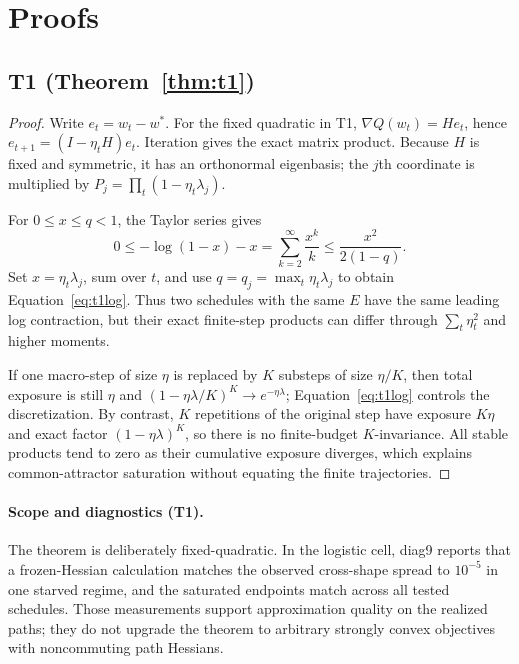 \documentclass{article}
\newcommand{\Expo}{E}         %
\begin{document}
\section{Proofs}
\label{app:proofs}
\subsection{T1 (Theorem~\ref{thm:t1})}
\begin{proof}[Proof]
Write $e_t=w_t-w^*$. For the fixed quadratic in T1,
$\nabla Q(w_t)=He_t$, hence $e_{t+1}=(I-\eta_tH)e_t$. Iteration gives the exact matrix product.
Because $H$ is fixed and symmetric, it has an orthonormal eigenbasis; the $j$th coordinate is
multiplied by $P_j=\prod_t(1-\eta_t\lambda_j)$.

For $0\leq x\leq q<1$, the Taylor series gives
\begin{equation}
0\leq-\log(1-x)-x=\sum_{k=2}^{\infty}\frac{x^k}{k}
\leq\frac{x^2}{2(1-q)}.
\end{equation}
Set $x=\eta_t\lambda_j$, sum over $t$, and use
$q=q_j=\max_t\eta_t\lambda_j$ to obtain Equation~\ref{eq:t1log}. Thus two schedules with the
same $\Expo$ have the same leading log contraction, but their exact finite-step products can
differ through $\sum_t\eta_t^2$ and higher moments.

If one macro-step of size $\eta$ is replaced by $K$ substeps of size $\eta/K$, then total
exposure is still $\eta$ and
$(1-\eta\lambda/K)^K\to e^{-\eta\lambda}$; Equation~\ref{eq:t1log} controls the discretization.
By contrast, $K$ repetitions of the original step have exposure $K\eta$ and exact factor
$(1-\eta\lambda)^K$, so there is no finite-budget $K$-invariance. All stable products tend to
zero as their cumulative exposure diverges, which explains common-attractor saturation without
equating the finite trajectories.
\end{proof}

\paragraph{Scope and diagnostics (T1).} The theorem is deliberately fixed-quadratic. In the
logistic cell, diag9 reports that a frozen-Hessian calculation matches the observed cross-shape
spread to $10^{-5}$ in one starved regime, and the saturated endpoints match across all tested
schedules. Those measurements support approximation quality on the realized paths; they do not
upgrade the theorem to arbitrary strongly convex objectives with noncommuting path Hessians.
\end{document}
